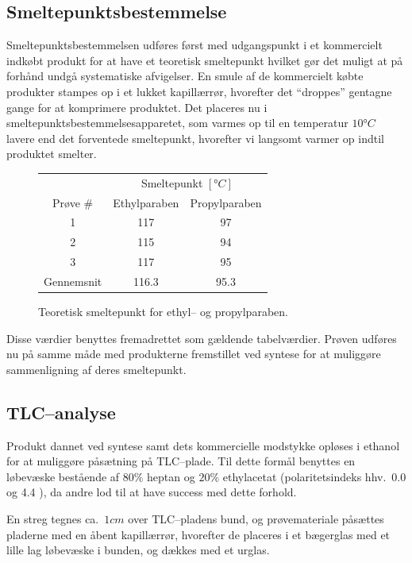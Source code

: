     \subsection{Smeltepunktsbestemmelse}
    Smeltepunktsbestemmelsen udføres først med udgangspunkt i et kommercielt indkøbt produkt for at have et teoretisk smeltepunkt hvilket gør det muligt at på forhånd undgå systematiske afvigelser. En smule af de kommercielt købte produkter stampes op i et lukket kapillærrør, hvorefter det ``droppes'' gentagne gange for at komprimere produktet. Det placeres nu i smeltepunktsbestemmelsesapparetet, som varmes op til en temperatur $10\si{\degree C}$ lavere end det forventede smeltepunkt, hvorefter vi langsomt varmer op indtil produktet smelter.
    \begin{figure}[H]\centering
        \caption{Teoretisk smeltepunkt for ethyl-- og propylparaben.}
        \begin{tabular}{ccc}
            \toprule
            & \multicolumn{2}{c}{Smeltepunkt $\left[\si{\degree C}\right]$} \\
            \cmidrule(r){2-3}
            Prøve # & Ethylparaben & Propylparaben \\
            \midrule
            1 & 117 & 97 \\
            2 & 115 & 94 \\
            3 & 117 & 95 \\
            \midrule
            Gennemsnit & 116.3 & 95.3 \\
            \bottomrule
        \end{tabular}
    \end{figure}
    Disse værdier benyttes fremadrettet som gældende tabelværdier. Prøven udføres nu på samme måde med produkterne fremstillet ved syntese for at muliggøre sammenligning af deres smeltepunkt.

    \subsection{TLC--analyse}
    Produkt dannet ved syntese samt dets kommercielle modstykke opløses i ethanol for at muliggøre påsætning på TLC--plade. Til dette formål benyttes en løbevæske bestående af $80\%$ heptan og $20\%$ ethylacetat (polaritetsindeks hhv.\ 0.0 og 4.4 \parencite{Phen}), da andre lod til at have success med dette forhold.

    En streg tegnes ca.\ $1\si{cm}$ over TLC--pladens bund, og prøvemateriale påsættes pladerne med en åbent kapillærrør, hvorefter de placeres i et bægerglas med et lille lag løbevæske i bunden, og dækkes med et urglas.

